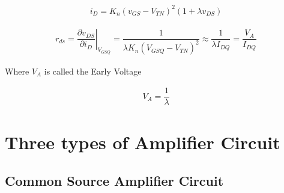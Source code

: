 \begin{equation*}
  \begin{aligned}
    i_D = K_n \left( v_{GS} - V_{TN} \right)^2 \left( 1 + \lambda v_{DS} \right)
  \end{aligned}
\end{equation*}

\begin{equation*}
  \begin{aligned}
    r_{ds} = \left. \dfrac{\partial v_{DS}}{\partial i_D} \right|_{V_{GSQ}} = \dfrac{1}{\lambda K_n \left( V_{GSQ} - V_{TN} \right)^2} \approx \dfrac{1}{\lambda I_{DQ}} = \dfrac{V_A}{I_{DQ}}   
  \end{aligned}
\end{equation*}

Where $V_A$ is called the Early Voltage

\begin{equation*}
  \begin{aligned}
    V_A = \dfrac{1}{\lambda} 
  \end{aligned}
\end{equation*}

\section{Three types of Amplifier Circuit}

\subsection{Common Source Amplifier Circuit}

